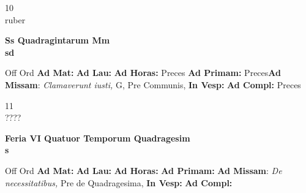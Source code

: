 \documentclass[10pt, openany]{book}
\begin{document}
    \begin{center}
        \begin{minipage}{3.5in}
            \vspace{2em}
            \begin{minipage}{0.5in}
                {\Huge 10} \\
                {\normalsize ruber}
            \end{minipage}
            \begin{minipage}{3.0in}
                \textbf{ \large Ss Quadragintarum Mm \\
                \textnormal{\normalsize sd}}

            \end{minipage}
            \begin{justify}Off Ord
                \textbf{Ad Mat: }
                \textbf{Ad Lau: }
                \textbf{Ad Horas: }Preces
                \textbf{Ad Primam: }Preces\textbf{Ad Missam}: \textit{Clamaverunt iusti,} G, Pre Communis, 
                \textbf{In Vesp: }
                \textbf{Ad Compl: }Preces
            \end{justify}
        \end{minipage}
    \end{center}

    \begin{center}
        \begin{minipage}{3.5in}
            \vspace{2em}
            \begin{minipage}{0.5in}
                {\Huge 11} \\
                {\normalsize ????}
            \end{minipage}
            \begin{minipage}{3.0in}
                \textbf{ \large Feria VI Quatuor Temporum Quadragesim \\
                \textnormal{\normalsize s}}

            \end{minipage}
            \begin{justify}Off Ord
                \textbf{Ad Mat: }
                \textbf{Ad Lau: }
                \textbf{Ad Horas: }
                \textbf{Ad Primam: }\textbf{Ad Missam}: \textit{De necessitatibus,} Pre de Quadragesima, 
                \textbf{In Vesp: }
                \textbf{Ad Compl: }
            \end{justify}
        \end{minipage}
    \end{center}
\end{document}
